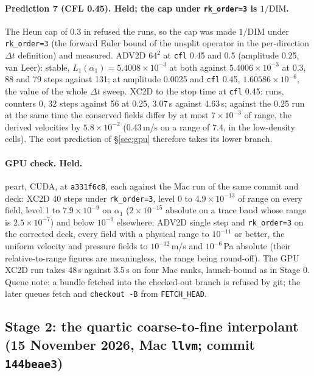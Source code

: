 \documentclass[11pt,a4paper]{article}
\newcommand{\code}[1]{\texttt{\small #1}}
\begin{document}
\paragraph{Prediction 7 (CFL 0.45).  Held; the cap under \code{rk\_order=3} is $1/\mathrm{DIM}$.}
The Heun cap of 0.3 in  refused the runs, so the cap was
made $1/\mathrm{DIM}$ under \code{rk\_order=3} (the forward Euler bound of
the unsplit operator in the per-direction $\Delta t$ definition) and
measured.  ADV2D $64^2$ at \code{cfl} 0.45 and 0.5 (amplitude 0.25, van
Leer): stable, $L_1(\alpha_1) = 5.4008\times10^{-3}$ at both against
$5.4006\times10^{-3}$ at 0.3, 88 and 79 steps against 131; at amplitude
0.0025 and \code{cfl} 0.45, $1.60586\times10^{-6}$, the value of the
whole $\Delta t$ sweep.  XC2D to the stop time at \code{cfl} 0.45:
runs, counters 0, 32 steps against 56 at 0.25, 3.07\,s against 4.63\,s;
against the 0.25 run at the same time the conserved fields differ by at
most $7\times10^{-3}$ of range, the derived velocities by
$5.8\times10^{-2}$ (0.43\,m/s on a range of 7.4, in the low-density
cells).  The cost prediction of \S\ref{sec:gpu} therefore takes its
lower branch.

\paragraph{GPU check.  Held.}  peart, CUDA, at \code{a331f6c8}, each
against the Mac run of the same commit and deck: XC2D 40 steps under
\code{rk\_order=3}, level 0 to $4.9\times10^{-13}$ of range on every
field, level 1 to $7.9\times10^{-9}$ on $\alpha_1$ ($2\times10^{-15}$
absolute on a trace band whose range is $2.5\times10^{-7}$) and below
$10^{-9}$ elsewhere; ADV2D single step and \code{rk\_order=3} on the
corrected deck, every field with a physical range to $10^{-11}$ or
better, the uniform velocity and pressure fields to $10^{-12}$\,m/s and
$10^{-6}$\,Pa absolute (their relative-to-range figures are
meaningless, the range being round-off).  The GPU XC2D run takes 48\,s
against 3.5\,s on four Mac ranks, launch-bound as in Stage 0.  Queue
note: a bundle fetched into the checked-out branch is refused by git;
the later queues fetch and \code{checkout -B} from \code{FETCH\_HEAD}.


\subsection{Stage 2: the quartic coarse-to-fine interpolant (15 November 2026, Mac \code{llvm}; commit \code{144beae3})}
\label{sec:stage2}
\end{document}
